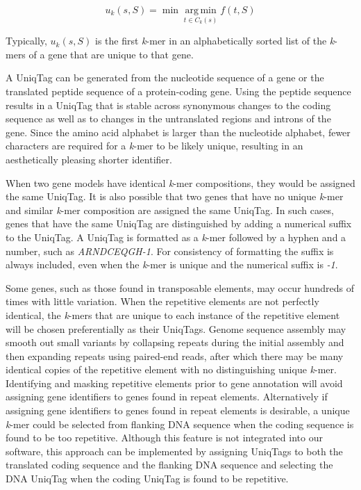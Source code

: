 \documentclass[
  12pt,
  oneside,
  openany]{book}
\begin{document}
\[
u_k(s, S) = \min \mathop{\arg\,\min}\limits_{t \in C_k(s)} f(t, S)
\]

Typically, \(u_k(s, S)\) is the first \emph{k}-mer in an alphabetically sorted list of the \emph{k}-mers of a gene that are unique to that gene.

A UniqTag can be generated from the nucleotide sequence of a gene or the translated peptide sequence of a protein-coding gene. Using the peptide sequence results in a UniqTag that is stable across synonymous changes to the coding sequence as well as to changes in the untranslated regions and introns of the gene. Since the amino acid alphabet is larger than the nucleotide alphabet, fewer characters are required for a \emph{k}-mer to be likely unique, resulting in an aesthetically pleasing shorter identifier.

When two gene models have identical \emph{k}-mer compositions, they would be assigned the same UniqTag. It is also possible that two genes that have no unique \emph{k}-mer and similar \emph{k}-mer composition are assigned the same UniqTag. In such cases, genes that have the same UniqTag are distinguished by adding a numerical suffix to the UniqTag. A UniqTag is formatted as a \emph{k}-mer followed by a hyphen and a number, such as \emph{ARNDCEQGH-1}. For consistency of formatting the suffix is always included, even when the \emph{k}-mer is unique and the numerical suffix is \emph{-1}.

Some genes, such as those found in transposable elements, may occur hundreds of times with little variation. When the repetitive elements are not perfectly identical, the \emph{k}-mers that are unique to each instance of the repetitive element will be chosen preferentially as their UniqTags. Genome sequence assembly may smooth out small variants by collapsing repeats during the initial assembly and then expanding repeats using paired-end reads, after which there may be many identical copies of the repetitive element with no distinguishing unique \emph{k}-mer. Identifying and masking repetitive elements prior to gene annotation will avoid assigning gene identifiers to genes found in repeat elements. Alternatively if assigning gene identifiers to genes found in repeat elements is desirable, a unique \emph{k}-mer could be selected from flanking DNA sequence when the coding sequence is found to be too repetitive. Although this feature is not integrated into our software, this approach can be implemented by assigning UniqTags to both the translated coding sequence and the flanking DNA sequence and selecting the DNA UniqTag when the coding UniqTag is found to be repetitive.
\end{document}
